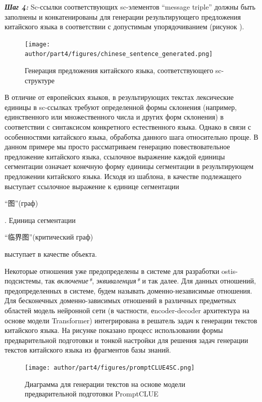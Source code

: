 \textbf{\textit{Шаг 4:}} Sc-ссылки соответствующих sc-элементов ``message triple'' должны быть заполнены и конкатенированы для генерации результирующего предложения китайского языка в соответствии с допустимым упорядочиванием (рисунок \textit{}).
\begin{figure}[H]
	\centering
	\texttt{[image: author/part4/figures/chinese\_sentence\_generated.png]}
	\caption{Генерация предложения китайского языка, соответствующего sc-структуре}
	\label{fig:sentence-generated}
\end{figure}

В отличие от европейских языков, в результирующих текстах лексические единицы в sc-ссылках требуют определенной формы склонения (например, единственного или множественного числа и других форм склонения) в соответствии с синтаксисом конкретного естественного языка. Однако в связи с особенностями китайского языка, обработка данного шага относительно проще. В данном примере мы просто рассматриваем генерацию повествовательное предложение китайского языка, ссылочное выражение каждой единицы сегментации означает конечную форму единицы сегментации в результирующем предложении китайского языка. Исходя из шаблона, в качестве подлежащего выступает ссылочное выражение к единице сегментации \begin{CJK}{UTF8}{gbsn} ``图''(граф) \end{CJK}. Единица сегментации \begin{CJK}{UTF8}{gbsn} ``临界图''(критический граф) \end{CJK} выступает в качестве объекта. 

Некоторые отношения уже предопределены в  системе для разработки ostis-подсистемы, так \textit{включение*}, \textit{эквиваленция*} и так далее. Для данных отношений, предопределенных в  системе, будем называть доменно-независимые отношения. Для бесконечных доменно-зависимых отношений в различных предметных областей модель нейронной сети (в частности, еncoder-decoder архитектура на основе модели Transformer) интегрирована в решатель задач к генерации текстов китайского языка. На рисунке \textit{} показано процесс использовании формы предварительной подготовки и тонкой настройки для решения задач генерации текстов китайского языка из фрагментов базы знаний. 
\begin{figure}[H]
	\texttt{[image: author/part4/figures/promptCLUE4SC.png]}
	\caption{Диаграмма для генерации текстов на основе модели предварительной подготовки PromptCLUE}
	\label{fig:pre-training-model}
\end{figure}


